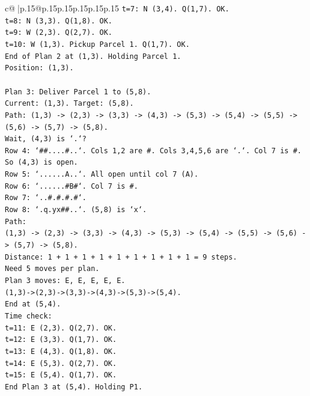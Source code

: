 \documentclass{article}
\begin{document}
{\begin{supertabular}{c@{$\;$}|p{.15\linewidth}@{}p{.15\linewidth}p{.15\linewidth}p{.15\linewidth}p{.15\linewidth}p{.15\linewidth}}
{{{\texttt{t=7: N (3,4). Q(1,7). OK.} \\
\texttt{t=8: N (3,3). Q(1,8). OK.} \\
\texttt{t=9: W (2,3). Q(2,7). OK.} \\
\texttt{t=10: W (1,3). Pickup Parcel 1. Q(1,7). OK.} \\
\texttt{End of Plan 2 at (1,3). Holding Parcel 1.} \\
\texttt{Position: (1,3).} \\
\\ 
\texttt{Plan 3: Deliver Parcel 1 to (5,8).} \\
\texttt{Current: (1,3). Target: (5,8).} \\
\texttt{Path: (1,3) {-}> (2,3) {-}> (3,3) {-}> (4,3) {-}> (5,3) {-}> (5,4) {-}> (5,5) {-}> (5,6) {-}> (5,7) {-}> (5,8).} \\
\texttt{Wait, (4,3) is `.`?} \\
\texttt{Row 4: `\#\#....\#..`. Cols 1,2 are \#. Cols 3,4,5,6 are `.`. Col 7 is \#.} \\
\texttt{So (4,3) is open.} \\
\texttt{Row 5: `......A..`. All open until col 7 (A).} \\
\texttt{Row 6: `......\#B\#`. Col 7 is \#.} \\
\texttt{Row 7: `..\#.\#.\#.\#`.} \\
\texttt{Row 8: `.q.yx\#\#..`. (5,8) is `x`.} \\
\texttt{Path:} \\
\texttt{(1,3) {-}> (2,3) {-}> (3,3) {-}> (4,3) {-}> (5,3) {-}> (5,4) {-}> (5,5) {-}> (5,6) {-}> (5,7) {-}> (5,8).} \\
\texttt{Distance: 1 + 1 + 1 + 1 + 1 + 1 + 1 + 1 + 1 = 9 steps.} \\
\texttt{Need 5 moves per plan.} \\
\texttt{Plan 3 moves: E, E, E, E, E.} \\
\texttt{(1,3){-}>(2,3){-}>(3,3){-}>(4,3){-}>(5,3){-}>(5,4).} \\
\texttt{End at (5,4).} \\
\texttt{Time check:} \\
\texttt{t=11: E (2,3). Q(2,7). OK.} \\
\texttt{t=12: E (3,3). Q(1,7). OK.} \\
\texttt{t=13: E (4,3). Q(1,8). OK.} \\
\texttt{t=14: E (5,3). Q(2,7). OK.} \\
\texttt{t=15: E (5,4). Q(1,7). OK.} \\
\texttt{End Plan 3 at (5,4). Holding P1.} \\
}}}
\end{supertabular}}
\end{document}
